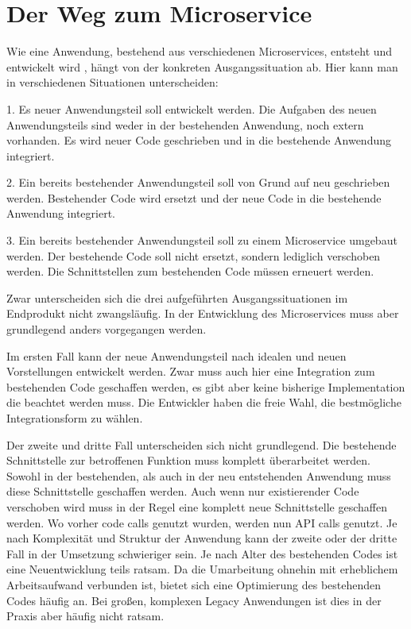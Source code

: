 \section{Der Weg zum Microservice}
Wie eine Anwendung, bestehend aus verschiedenen Microservices, entsteht und entwickelt wird , hängt von der konkreten Ausgangssituation ab. Hier kann man in verschiedenen Situationen unterscheiden:

1. Es neuer Anwendungsteil soll entwickelt werden. Die Aufgaben des neuen Anwendungsteils sind weder in der bestehenden Anwendung, noch extern vorhanden. Es wird neuer Code geschrieben und in die bestehende Anwendung integriert.

2. Ein bereits bestehender Anwendungsteil soll von Grund auf neu geschrieben werden. Bestehender Code wird ersetzt und der neue Code in die bestehende Anwendung integriert.

3. Ein bereits bestehender Anwendungsteil soll zu einem Microservice umgebaut werden. Der bestehende Code soll nicht ersetzt, sondern lediglich verschoben werden. Die Schnittstellen zum bestehenden Code müssen erneuert werden.

Zwar unterscheiden sich die drei aufgeführten Ausgangssituationen im Endprodukt nicht zwangsläufig. In der Entwicklung des Microservices muss aber grundlegend anders vorgegangen werden. 

Im ersten Fall kann der neue Anwendungsteil nach idealen und neuen Vorstellungen entwickelt werden. Zwar muss auch hier eine Integration zum bestehenden Code geschaffen werden, es gibt aber keine bisherige Implementation die beachtet werden muss. Die Entwickler haben die freie Wahl, die bestmögliche Integrationsform zu wählen.

Der zweite und dritte Fall unterscheiden sich nicht grundlegend. Die bestehende Schnittstelle zur betroffenen Funktion muss komplett überarbeitet werden. Sowohl in der bestehenden, als auch in der neu entstehenden Anwendung muss diese Schnittstelle geschaffen werden. Auch wenn nur existierender Code verschoben wird muss in der Regel eine komplett neue Schnittstelle geschaffen werden. Wo vorher code calls genutzt wurden, werden nun API calls genutzt. 
Je nach Komplexität und Struktur der Anwendung kann der zweite oder der dritte Fall in der Umsetzung schwieriger sein. Je nach Alter des bestehenden Codes ist eine Neuentwicklung teils ratsam. Da die Umarbeitung ohnehin mit erheblichem Arbeitsaufwand verbunden ist, bietet sich eine Optimierung des bestehenden Codes häufig an. Bei großen, komplexen Legacy Anwendungen ist dies in der Praxis aber häufig nicht ratsam.
